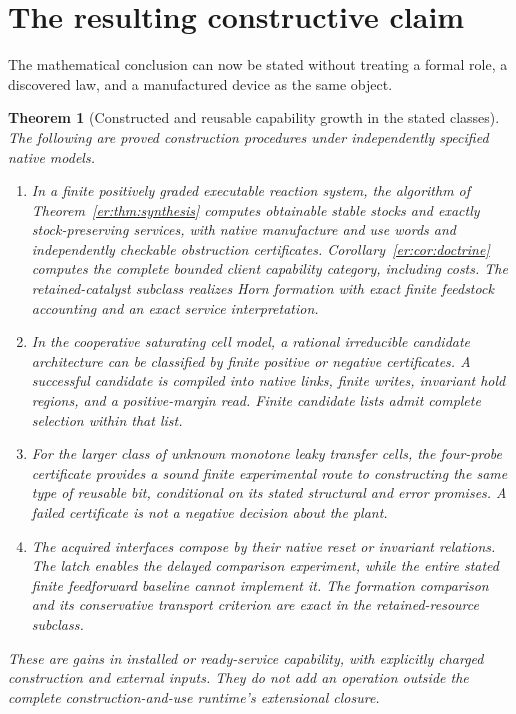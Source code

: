 \documentclass[11pt]{article}
\newtheorem{theorem}{Theorem}[section]
\theoremstyle{definition}
\theoremstyle{remark}
\begin{document}
\section{The resulting constructive claim}\label{sec:combined}
The mathematical conclusion can now be stated without treating a formal
role, a discovered law, and a manufactured device as the same object.

\begin{theorem}[Constructed and reusable capability growth in the stated classes]
\label{thm:combined}
The following are proved construction procedures under independently
specified native models.
\begin{enumerate}
\item In a finite positively graded executable reaction system, the
algorithm of Theorem~\ref{er:thm:synthesis} computes obtainable stable
stocks and exactly stock-preserving services, with native manufacture
and use words and independently checkable obstruction certificates.
Corollary~\ref{er:cor:doctrine} computes the complete bounded client
capability category, including costs. The retained-catalyst subclass
realizes Horn formation with exact finite feedstock accounting and an
exact service interpretation.
\item In the cooperative saturating cell model, a rational irreducible
candidate architecture can be classified by finite positive or negative
certificates. A successful candidate is compiled into native links,
finite writes, invariant hold regions, and a positive-margin read.
Finite candidate lists admit complete selection within that list.
\item For the larger class of unknown monotone leaky transfer cells,
the four-probe certificate provides a sound finite experimental route
to constructing the same type of reusable bit, conditional on its
stated structural and error promises. A failed certificate is not a
negative decision about the plant.
\item The acquired interfaces compose by their native reset or invariant
relations. The latch enables the delayed comparison experiment, while
the entire stated finite feedforward baseline cannot implement it.
The formation comparison and its conservative transport criterion are
exact in the retained-resource subclass.
\end{enumerate}
These are gains in installed or ready-service capability, with explicitly
charged construction and external inputs. They do not add an operation
outside the complete construction-and-use runtime's extensional closure.
\end{theorem}
\end{document}
